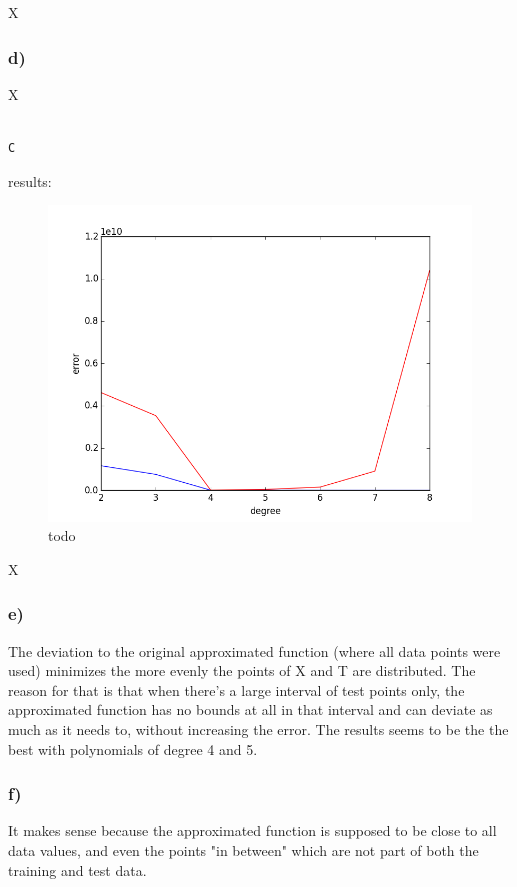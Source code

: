 X



\subsubsection{d)}

X

\begin{lstlisting}[caption=todo]

C

\end{lstlisting}


results:


\begin{figure}[!ht]
\includegraphics[width=1\textwidth]{chapters/images/figure-5-11-d}
\caption{todo}
\end{figure}

X





\subsubsection{e)}

The deviation to the original approximated function (where all data points were used) minimizes the more evenly the points of X and T are distributed. The reason for that is that when there's a large interval of test points only, the approximated function has no bounds at all in that interval and can deviate as much as it needs to, without increasing the error.
The results seems to be the the best with polynomials of degree 4 and 5.

\subsubsection{f)}


It makes sense because the approximated function is supposed to be close to all data values, and even the points "in between" which are not part of both the training and test data.